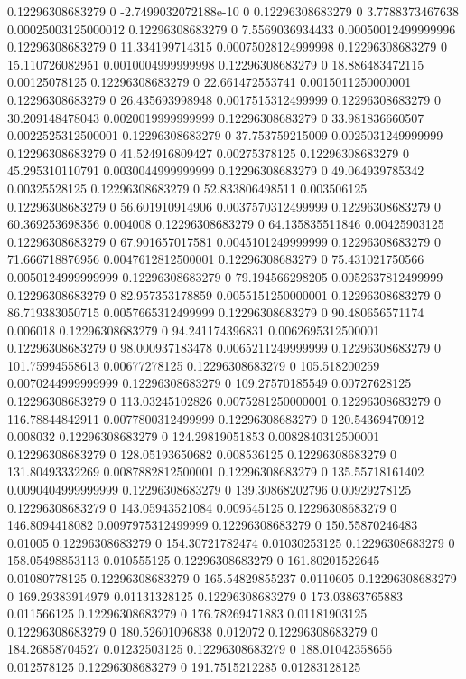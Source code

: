 0.12296308683279 0 -2.7499032072188e-10 0
0.12296308683279 0 3.7788373467638 0.00025003125000012
0.12296308683279 0 7.5569036934433 0.00050012499999996
0.12296308683279 0 11.334199714315 0.00075028124999998
0.12296308683279 0 15.110726082951 0.0010004999999998
0.12296308683279 0 18.886483472115 0.00125078125
0.12296308683279 0 22.661472553741 0.0015011250000001
0.12296308683279 0 26.435693998948 0.0017515312499999
0.12296308683279 0 30.209148478043 0.0020019999999999
0.12296308683279 0 33.981836660507 0.0022525312500001
0.12296308683279 0 37.753759215009 0.0025031249999999
0.12296308683279 0 41.524916809427 0.00275378125
0.12296308683279 0 45.295310110791 0.0030044999999999
0.12296308683279 0 49.064939785342 0.00325528125
0.12296308683279 0 52.833806498511 0.003506125
0.12296308683279 0 56.601910914906 0.0037570312499999
0.12296308683279 0 60.369253698356 0.004008
0.12296308683279 0 64.135835511846 0.00425903125
0.12296308683279 0 67.901657017581 0.0045101249999999
0.12296308683279 0 71.666718876956 0.0047612812500001
0.12296308683279 0 75.431021750566 0.0050124999999999
0.12296308683279 0 79.194566298205 0.0052637812499999
0.12296308683279 0 82.957353178859 0.0055151250000001
0.12296308683279 0 86.719383050715 0.0057665312499999
0.12296308683279 0 90.480656571174 0.006018
0.12296308683279 0 94.241174396831 0.0062695312500001
0.12296308683279 0 98.000937183478 0.0065211249999999
0.12296308683279 0 101.75994558613 0.00677278125
0.12296308683279 0 105.518200259 0.0070244999999999
0.12296308683279 0 109.27570185549 0.00727628125
0.12296308683279 0 113.03245102826 0.0075281250000001
0.12296308683279 0 116.78844842911 0.0077800312499999
0.12296308683279 0 120.54369470912 0.008032
0.12296308683279 0 124.29819051853 0.0082840312500001
0.12296308683279 0 128.05193650682 0.008536125
0.12296308683279 0 131.80493332269 0.0087882812500001
0.12296308683279 0 135.55718161402 0.0090404999999999
0.12296308683279 0 139.30868202796 0.00929278125
0.12296308683279 0 143.05943521084 0.009545125
0.12296308683279 0 146.8094418082 0.0097975312499999
0.12296308683279 0 150.55870246483 0.01005
0.12296308683279 0 154.30721782474 0.01030253125
0.12296308683279 0 158.05498853113 0.010555125
0.12296308683279 0 161.80201522645 0.01080778125
0.12296308683279 0 165.54829855237 0.0110605
0.12296308683279 0 169.29383914979 0.01131328125
0.12296308683279 0 173.03863765883 0.011566125
0.12296308683279 0 176.78269471883 0.01181903125
0.12296308683279 0 180.52601096838 0.012072
0.12296308683279 0 184.26858704527 0.01232503125
0.12296308683279 0 188.01042358656 0.012578125
0.12296308683279 0 191.7515212285 0.01283128125
